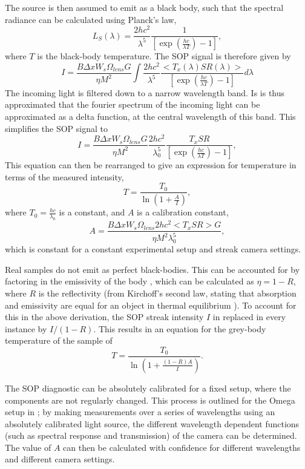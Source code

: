 The source is then assumed to emit as a black body, such that the spectral radiance can be calculated using Planck's law, 
\begin{equation} L_S(\lambda) =  \frac{2hc^2}{\lambda^5} \frac{1}{[\exp(\frac{hc}{\lambda T}) - 1]}, \end{equation} where $T$ is the black-body temperature. The SOP signal is therefore given by 
\begin{equation} I = \frac{B \Delta x W_s \Omega_{lens} G}{\eta M^2} \int {\frac{2hc^2}{\lambda^5} \frac{<T_x(\lambda)SR(\lambda)>}{[\exp(\frac{hc}{\lambda T}) - 1]} d\lambda} \end{equation}
The incoming light is filtered down to a narrow wavelength band. Is is thus approximated that the fourier spectrum of the incoming light can be approximated as a delta function, at the central wavelength of this band. This simplifies the SOP signal to
\begin{equation} I = \frac{B \Delta x W_s \Omega_{lens} G}{\eta M^2} \frac{2hc^2}{\lambda_0^5} \frac{T_x SR }{ [\exp(\frac{hc}{\lambda T}) - 1]} , \end{equation}
This equation can then be rearranged to give an expression for temperature in terms of the measured intensity, 
\begin{equation} T = \frac{T_0}{\ln(1 + \frac{A}{I})}, \end{equation}
where $T_0 = \frac{hc}{\lambda_0}$ is a constant, and $A$ is a calibration constant,
\begin{equation} A = \frac{B \Delta x W_s \Omega_{lens} 2hc^2 <T_x SR> G}{\eta M^2 \lambda_0^5} , \end{equation}
which is constant for a constant experimental setup and streak camera settings.

Real samples do not emit as perfect black-bodies. This can be accounted for by factoring in the emissivity of the body \cite{Gregor2016}, which can be calculated as $\eta = 1 - R$, where $R$ is the reflectivity (from Kirchoff's second law, stating that absorption and emissivity are equal for an object in thermal equilibrium \cite{Zeldovich1966}). To account for this in the above derivation, the SOP streak intensity $I$ in replaced in every instance by $I/(1-R)$. This results in an equation for the grey-body temperature of the sample of \begin{equation} T = \frac{T_0}{\ln(1 + \frac{(1-R)A}{I})}. \label{eqn: SOP eqn} \end{equation}

The SOP diagnostic can be absolutely calibrated for a fixed setup, where the components are not regularly changed. This process is outlined for the Omega setup in \cite{Gregor2016}; by making measurements over a series of wavelengths using an absolutely calibrated light source, the different wavelength dependent functions (such as spectral response and transmission) of the camera can be determined. The value of $A$ can then be calculated with confidence for different wavelengths and different camera settings. 


